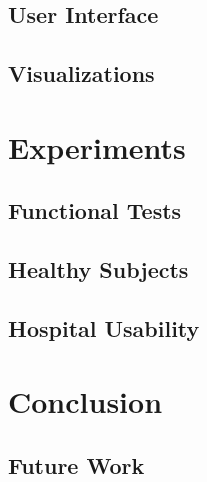 \documentclass[12pt]{report}
\begin{document}
	\section{User Interface}
%
%
	\section{Visualizations}
%
	
\chapter{Experiments}
	\section{Functional Tests}
	\section{Healthy Subjects}
		
	\section{Hospital Usability} 
	
\chapter{Conclusion}
	\section{Future Work}
	
	


\end{document}
